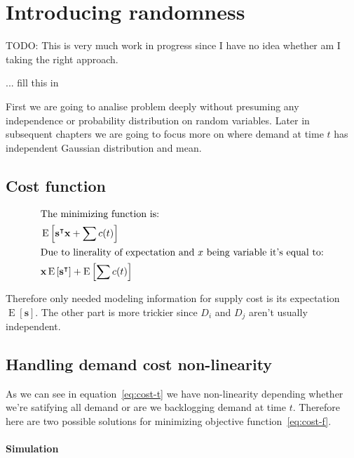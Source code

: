 
\chapter{Introducing randomness}
\label{chap:solution-randomness}

TODO: This is very much work in progress since I have no idea whether am I taking the right approach.

... fill this in

First we are going to analise problem deeply without presuming any independence or probability distribution on random variables. Later in subsequent chapters we are going to focus more on where demand at time $t$ has independent Gaussian distribution and mean.

\section{Cost function}
\begin{align*}
\shortintertext{The minimizing function is:}
    & \operatorname{E} \left[
        \mathbf{s}^\intercal\mathbf{x} + \sum{c(t)}
    \right] \\
\shortintertext{Due to linerality of expectation and $x$ being variable it's equal to:}
    & \mathbf{x} \operatorname{E} \left[
        \mathbf{s}^\intercal
        \right] +
        \operatorname{E} \left[ \sum{c(t)} \right] \\
\end{align*}

Therefore only needed modeling information for supply cost is its expectation $\operatorname{E} \left[ \mathbf{s} \right]$. The other part is more trickier since $D_i$ and $D_j$ aren't usually independent.

\section{Handling demand cost non-linearity}
\label{sec:Handling demand cost non-linearity}

As we can see in equation~\ref{eq:cost-t} we have non-linearity depending whether we're satifying all demand or are we backlogging demand at time $t$. Therefore here are two possible solutions for minimizing objective function~\ref{eq:cost-f}.

\subsubsection{Simulation}
\label{subs:Simulation}

